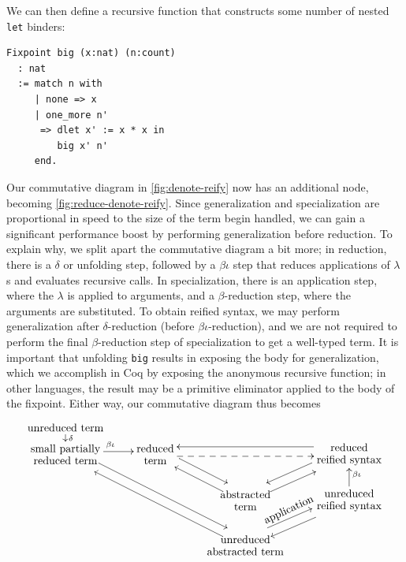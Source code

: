 We can then define a recursive function that constructs some number of nested \texttt{let} binders:
\label{sec:big-def}
\begin{verbatim}
Fixpoint big (x:nat) (n:count)
  : nat
  := match n with
     | none => x
     | one_more n'
      => dlet x' := x * x in
         big x' n'
     end.
\end{verbatim}
Our commutative diagram in \autoref{fig:denote-reify} now has an additional node, becoming \autoref{fig:reduce-denote-reify}.
Since generalization and specialization are proportional in speed to the size of the term begin handled, we can gain a significant performance boost by performing generalization before reduction.
To explain why, we split apart the commutative diagram a bit more; in reduction, there is a $\delta$ or unfolding step, followed by a $\beta\iota$ step that reduces applications of $\lambda$s and evaluates recursive calls.
In specialization, there is an application step, where the $\lambda$ is applied to arguments, and a $\beta$-reduction step, where the arguments are substituted.
To obtain reified syntax, we may perform generalization after $\delta$-reduction (before $\beta\iota$-reduction), and we are not required to perform the final $\beta$-reduction step of specialization to get a well-typed term.
It is important that unfolding \texttt{big} results in exposing the body for generalization, which we accomplish in Coq by exposing the anonymous recursive function; in other languages, the result may be a primitive eliminator applied to the body of the fixpoint.
Either way, our commutative diagram thus becomes \label{sec:expanded-reif-diagram}
\[
\xymatrix@R=0.5em{
    \txt{unreduced term} \ar[d]^{\delta} \\
    \txt{small partially \\ reduced term}
    \ar[r]^{\beta\iota}
    \ar@<1ex>[ddddrr]
    & \txt{reduced \\ term}
    \ar@<1ex>[ddr]
    \ar@<-1ex>@{-->}[rr]
    &&
    \txt{reduced \\ reified syntax}
    \ar@<-1ex>[ll]
    \ar@<-1ex>[ddl]
    \\ \\
    &&
    \txt{abstracted \\ term}
    \ar@<1ex>[uul]
    \ar@<-1ex>[uur]%
    &
    \txt{unreduced \\ reified syntax}
    \ar@<1ex>[ddl]
    \ar[uu]_{\beta\iota}
    \\ \\
    &&
    \txt{unreduced \\ abstracted term}
    \ar@<1ex>[uuuull]
    \ar@<1ex>[uur]^{\rotatebox{25}{\llap{\text{application\hspace*{-2em}}}}}
}
\]
